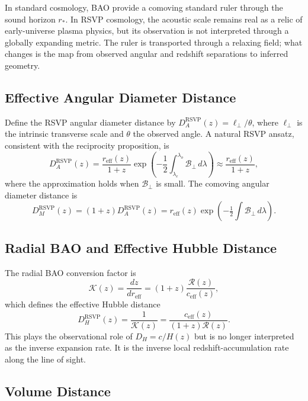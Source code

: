 \documentclass[12pt,a4paper]{article}
\theoremstyle{remark}
\newcommand{\Rcal}{\mathcal{R}}
\newcommand{\Bcal}{\mathcal{B}}
\newcommand{\reff}{r_{\mathrm{eff}}}
\newcommand{\DAr}{D_A^{\mathrm{RSVP}}}
\newcommand{\DHr}{D_H^{\mathrm{RSVP}}}
\newcommand{\DMr}{D_M^{\mathrm{RSVP}}}
\newcommand{\ceff}{c_{\mathrm{eff}}}
\begin{document}
In standard cosmology, BAO provide a comoving standard ruler through the sound horizon $r_\ast$. In RSVP cosmology, the acoustic scale remains real as a relic of early-universe plasma physics, but its observation is not interpreted through a globally expanding metric. The ruler is transported through a relaxing field; what changes is the map from observed angular and redshift separations to inferred geometry.

\subsection{Effective Angular Diameter Distance}

Define the RSVP angular diameter distance by $\DAr(z) = \ell_\perp / \theta$, where $\ell_\perp$ is the intrinsic transverse scale and $\theta$ the observed angle. A natural RSVP ansatz, consistent with the reciprocity proposition, is
\begin{equation}
\DAr(z) = \frac{\reff(z)}{1+z} \exp\!\left(-\frac12\int_{\lambda_e}^{\lambda_o}\Bcal_\perp\, d\lambda\right) \approx \frac{\reff(z)}{1+z},
\end{equation}
where the approximation holds when $\Bcal_\perp$ is small. The comoving angular diameter distance is
\begin{equation}
\DMr(z) = (1+z)\DAr(z) = \reff(z)\exp\!\left(-\tfrac12\int\Bcal_\perp\, d\lambda\right).
\end{equation}

\subsection{Radial BAO and Effective Hubble Distance}

The radial BAO conversion factor is
\begin{equation}
\mathcal{K}(z) = \frac{dz}{d\reff} = (1+z)\frac{\Rcal(z)}{\ceff(z)},
\end{equation}
which defines the effective Hubble distance
\begin{equation}
\boxed{\DHr(z) = \frac{1}{\mathcal{K}(z)} = \frac{\ceff(z)}{(1+z)\Rcal(z)}.}
\end{equation}
This plays the observational role of $D_H = c/H(z)$ but is no longer interpreted as the inverse expansion rate. It is the inverse local redshift-accumulation rate along the line of sight.

\subsection{Volume Distance}
\end{document}
